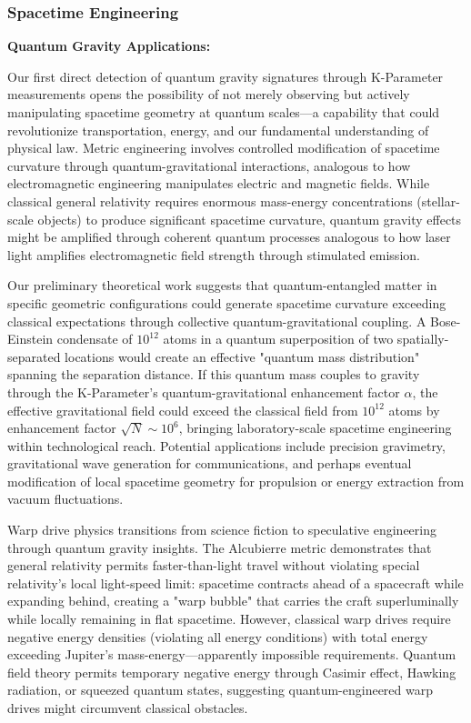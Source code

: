 \documentclass[11pt,a4paper,twoside]{article}
\begin{document}
\subsubsection{Spacetime Engineering}

\textbf{Quantum Gravity Applications:}

Our first direct detection of quantum gravity signatures through K-Parameter measurements opens the possibility of not merely observing but actively manipulating spacetime geometry at quantum scales---a capability that could revolutionize transportation, energy, and our fundamental understanding of physical law. Metric engineering involves controlled modification of spacetime curvature through quantum-gravitational interactions, analogous to how electromagnetic engineering manipulates electric and magnetic fields. While classical general relativity requires enormous mass-energy concentrations (stellar-scale objects) to produce significant spacetime curvature, quantum gravity effects might be amplified through coherent quantum processes analogous to how laser light amplifies electromagnetic field strength through stimulated emission.

Our preliminary theoretical work suggests that quantum-entangled matter in specific geometric configurations could generate spacetime curvature exceeding classical expectations through collective quantum-gravitational coupling. A Bose-Einstein condensate of $10^{12}$ atoms in a quantum superposition of two spatially-separated locations would create an effective "quantum mass distribution" spanning the separation distance. If this quantum mass couples to gravity through the K-Parameter's quantum-gravitational enhancement factor $\alpha$, the effective gravitational field could exceed the classical field from $10^{12}$ atoms by enhancement factor $\sqrt{N} \sim 10^6$, bringing laboratory-scale spacetime engineering within technological reach. Potential applications include precision gravimetry, gravitational wave generation for communications, and perhaps eventual modification of local spacetime geometry for propulsion or energy extraction from vacuum fluctuations.

Warp drive physics transitions from science fiction to speculative engineering through quantum gravity insights. The Alcubierre metric demonstrates that general relativity permits faster-than-light travel without violating special relativity's local light-speed limit: spacetime contracts ahead of a spacecraft while expanding behind, creating a "warp bubble" that carries the craft superluminally while locally remaining in flat spacetime. However, classical warp drives require negative energy densities (violating all energy conditions) with total energy exceeding Jupiter's mass-energy---apparently impossible requirements. Quantum field theory permits temporary negative energy through Casimir effect, Hawking radiation, or squeezed quantum states, suggesting quantum-engineered warp drives might circumvent classical obstacles.
\end{document}
